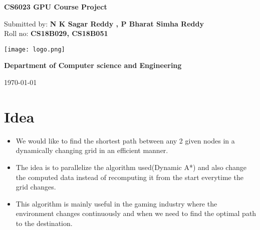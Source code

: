 \documentclass[12pt]{article}
\begin{document}
\begin{titlepage}


\setlength{\droptitle}{-4em} 
\center

{\huge \bfseries CS6023 GPU Course Project} %
\\[2cm] 


\begin{minipage}{0.4\textwidth}
\begin{center} \large
Submitted by: \textbf{N K Sagar Reddy , P Bharat Simha Reddy} %
\\[0.5cm]
Roll no: \textbf{CS18B029, CS18B051} %
\end{center}
\end{minipage} 

\vspace{12em}

\texttt{[image: logo.png]}

\vspace{12em}
\begin{minipage}{0.5\textwidth}
\begin{center} \large
\textbf{Department of Computer science and Engineering} %
\\[0.5cm]

\end{center}
\end{minipage} 

\vspace{5em}
{\large \today}


\end{titlepage}

\section{Idea}
\begin{itemize}
    \item We would like to find the shortest path between any 2 given nodes in a dynamically changing grid in an efficient manner.
    \item The idea is to parallelize the algorithm used(Dynamic A*) and also change the computed data instead of recomputing it from the start everytime the grid changes.
    \item This algorithm is mainly useful in the gaming industry where the environment changes continuously and when we need to find the optimal path to the destination.
\end{itemize}
\end{document}
